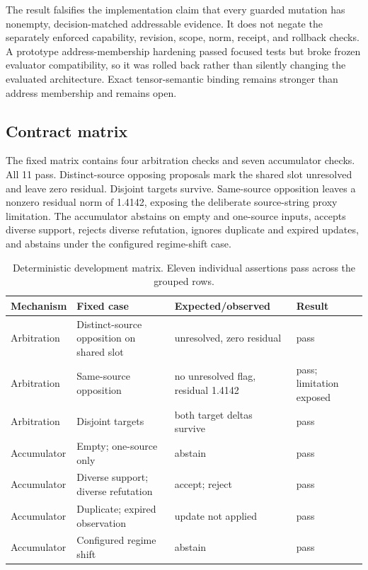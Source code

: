 \documentclass[10pt]{article}
\begin{document}
The result falsifies the implementation claim that every guarded mutation has nonempty, decision-matched addressable evidence. It does not negate the separately enforced capability, revision, scope, norm, receipt, and rollback checks. A prototype address-membership hardening passed focused tests but broke frozen evaluator compatibility, so it was rolled back rather than silently changing the evaluated architecture. Exact tensor-semantic binding remains stronger than address membership and remains open.

\subsection{Contract matrix}

The fixed matrix contains four arbitration checks and seven accumulator checks. All 11 pass. Distinct-source opposing proposals mark the shared slot unresolved and leave zero residual. Disjoint targets survive. Same-source opposition leaves a nonzero residual norm of 1.4142, exposing the deliberate source-string proxy limitation. The accumulator abstains on empty and one-source inputs, accepts diverse support, rejects diverse refutation, ignores duplicate and expired updates, and abstains under the configured regime-shift case.

\begin{table}[!htbp]
\centering
\small
\begin{tabularx}{0.995\textwidth}{@{}>{\raggedright\arraybackslash}p{}Y>{\raggedright\arraybackslash}p{0.17\textwidth}>{\raggedright\arraybackslash}p{0.13\textwidth}@{}}
\toprule
Mechanism & Fixed case & Expected/observed & Result \\
\midrule
Arbitration & Distinct-source opposition on shared slot & unresolved, zero residual & pass \\
Arbitration & Same-source opposition & no unresolved flag, residual 1.4142 & pass; limitation exposed \\
Arbitration & Disjoint targets & both target deltas survive & pass \\
Accumulator & Empty; one-source only & abstain & pass \\
Accumulator & Diverse support; diverse refutation & accept; reject & pass \\
Accumulator & Duplicate; expired observation & update not applied & pass \\
Accumulator & Configured regime shift & abstain & pass \\
\bottomrule
\end{tabularx}
\caption{Deterministic development matrix. Eleven individual assertions pass across the grouped rows.}
\label{tab:matrix}
\end{table}
\end{document}
